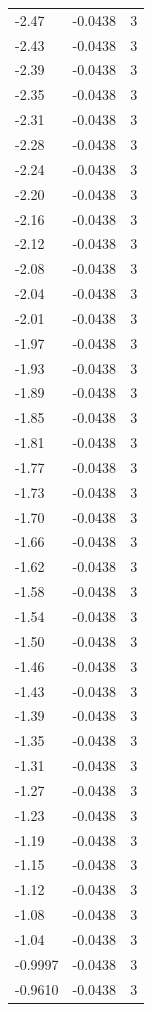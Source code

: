 \begin{longtable}{lrr}
  -2.47 & -0.0438 & 3 \\
  -2.43 & -0.0438 & 3 \\
  -2.39 & -0.0438 & 3 \\
  -2.35 & -0.0438 & 3 \\
  -2.31 & -0.0438 & 3 \\
  -2.28 & -0.0438 & 3 \\
  -2.24 & -0.0438 & 3 \\
  -2.20 & -0.0438 & 3 \\
  -2.16 & -0.0438 & 3 \\
  -2.12 & -0.0438 & 3 \\
  -2.08 & -0.0438 & 3 \\
  -2.04 & -0.0438 & 3 \\
  -2.01 & -0.0438 & 3 \\
  -1.97 & -0.0438 & 3 \\
  -1.93 & -0.0438 & 3 \\
  -1.89 & -0.0438 & 3 \\
  -1.85 & -0.0438 & 3 \\
  -1.81 & -0.0438 & 3 \\
  -1.77 & -0.0438 & 3 \\
  -1.73 & -0.0438 & 3 \\
  -1.70 & -0.0438 & 3 \\
  -1.66 & -0.0438 & 3 \\
  -1.62 & -0.0438 & 3 \\
  -1.58 & -0.0438 & 3 \\
  -1.54 & -0.0438 & 3 \\
  -1.50 & -0.0438 & 3 \\
  -1.46 & -0.0438 & 3 \\
  -1.43 & -0.0438 & 3 \\
  -1.39 & -0.0438 & 3 \\
  -1.35 & -0.0438 & 3 \\
  -1.31 & -0.0438 & 3 \\
  -1.27 & -0.0438 & 3 \\
  -1.23 & -0.0438 & 3 \\
  -1.19 & -0.0438 & 3 \\
  -1.15 & -0.0438 & 3 \\
  -1.12 & -0.0438 & 3 \\
  -1.08 & -0.0438 & 3 \\
  -1.04 & -0.0438 & 3 \\
  -0.9997 & -0.0438 & 3 \\
  -0.9610 & -0.0438 & 3 \\

\end{longtable}
